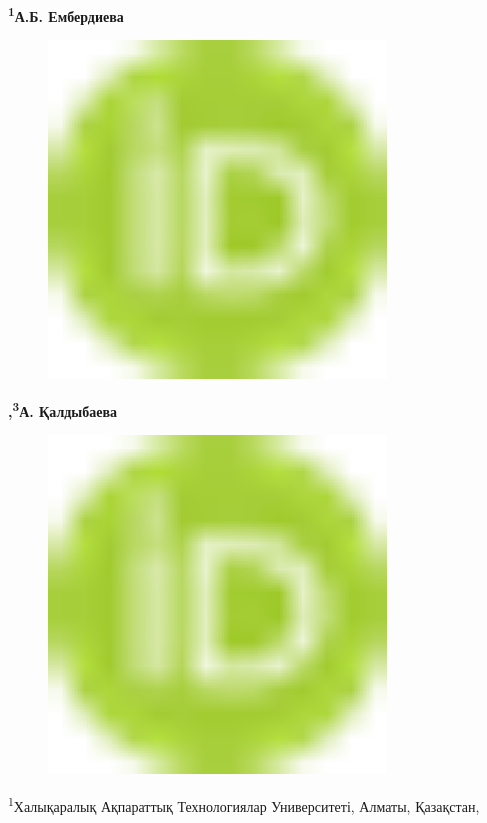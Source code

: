 {\bfseries \textsuperscript{1}А.Б.
Ембердиева}
\begin{figure}[H]
	\centering
	\includegraphics[width=0.8\textwidth]{media/ict/image16}
	\caption*{}
\end{figure}
{\bfseries ,\textsuperscript{3}А.
Қалдыбаева}
\begin{figure}[H]
	\centering
	\includegraphics[width=0.8\textwidth]{media/ict/image16}
	\caption*{}
\end{figure}


\textsuperscript{1}Халықаралық Ақпараттық Технологиялар Университеті,
Алматы, Қазақстан,

